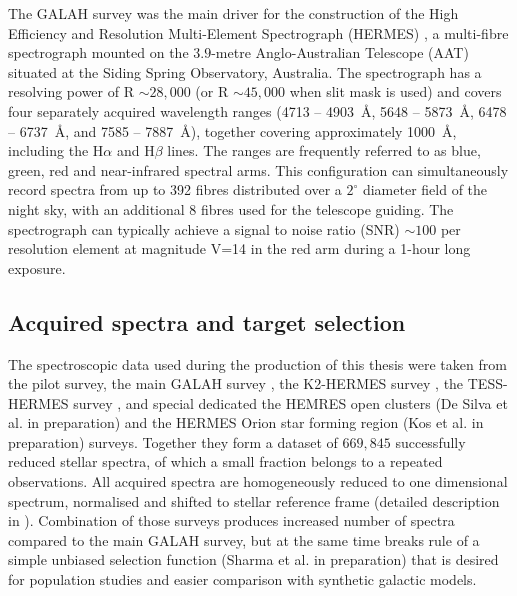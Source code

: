 The GALAH survey was the main driver for the construction of the High Efficiency and Resolution Multi-Element Spectrograph (HERMES) \citep{2010SPIE.7735E..09B, 2015JATIS...1c5002S}, a multi-fibre spectrograph mounted on the $3.9$-metre Anglo-Australian Telescope (AAT) situated at the Siding Spring Observatory, Australia. The spectrograph has a resolving power of R $\sim 28,000$ (or R $\sim 45,000$ when slit mask is used) and covers four separately acquired wavelength ranges (4713 -- 4903~\AA, 5648 -- 5873~\AA, 6478 -- 6737~\AA, and 7585 -- 7887~\AA), together covering approximately 1000~\AA, including the H$\alpha$ and H$\beta$ lines. The ranges are frequently referred to as blue, green, red and near-infrared spectral arms. This configuration can simultaneously record spectra from up to 392 fibres distributed over a $2^\circ$ diameter field of the night sky, with an additional 8 fibres used for the telescope guiding. The spectrograph can typically achieve a signal to noise ratio (SNR) $\sim100$ per resolution element at magnitude V=14 in the red arm during a 1-hour long exposure. 

\subsection{Acquired spectra and target selection}
The spectroscopic data used during the production of this thesis were taken from the pilot survey, the main GALAH survey \citep{2015MNRAS.449.2604D}, the K2-HERMES survey \citep{2018AJ....155...84W}, the TESS-HERMES survey \citep{2018MNRAS.473.2004S}, and special dedicated the HEMRES open clusters (De Silva et al. in preparation) and the HERMES Orion star forming region (Kos et al. in preparation) surveys. Together they form a dataset of $669,845$ successfully reduced stellar spectra, of which a small fraction belongs to a repeated observations. All acquired spectra are homogeneously reduced to one dimensional spectrum, normalised and shifted to stellar reference frame (detailed description in \citet{2017MNRAS.464.1259K}). Combination of those surveys produces increased number of spectra compared to the main GALAH survey, but at the same time breaks rule of a simple unbiased selection function (Sharma et al. in preparation) that is desired for population studies and easier comparison with synthetic galactic models.

